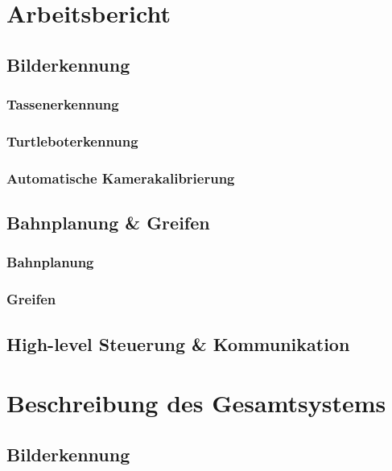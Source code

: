 \documentclass[de,ids]{fziartcl}
\begin{document}
\section{Arbeitsbericht} %
\subsection{Bilderkennung}
\subsubsection{Tassenerkennung}
\subsubsection{Turtleboterkennung}
\subsubsection{Automatische Kamerakalibrierung}
\subsection{Bahnplanung \& Greifen}
\subsubsection{Bahnplanung}
\subsubsection{Greifen}

\subsection{High-level Steuerung \& Kommunikation}

\section{Beschreibung des Gesamtsystems} %
\subsection{Bilderkennung}
\end{document}
